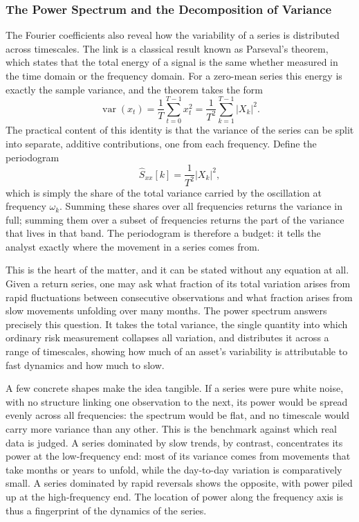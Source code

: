 \documentclass[12pt,a4paper]{article}
\begin{document}
\subsubsection{The Power Spectrum and the Decomposition of Variance}
\label{sec:power_spectrum}

The Fourier coefficients also reveal how the variability of a series is
distributed across timescales. The link is a classical result known as
Parseval's theorem, which states that the total energy of a signal is the
same whether measured in the time domain or the frequency domain. For a
zero-mean series this energy is exactly the sample variance, and the
theorem takes the form
\begin{equation}
    \operatorname{var}(x_t) = \frac{1}{T} \sum_{t=0}^{T-1} x_t^2
    = \frac{1}{T^2} \sum_{k=1}^{T-1} |X_k|^2.
\end{equation}
The practical content of this identity is that the variance of the series
can be split into separate, additive contributions, one from each
frequency. Define the periodogram
\begin{equation}
    \hat{S}_{xx}[k] = \frac{1}{T^2} |X_k|^2,
\end{equation}
which is simply the share of the total variance carried by the
oscillation at frequency $\omega_k$. Summing these shares over all
frequencies returns the variance in full; summing them over a subset of
frequencies returns the part of the variance that lives in that band. The
periodogram is therefore a budget: it tells the analyst exactly where the
movement in a series comes from.

This is the heart of the matter, and it can be stated without any
equation at all. Given a return series, one may ask what fraction of its
total variation arises from rapid fluctuations between consecutive
observations and what fraction arises from slow movements unfolding over
many months. The power spectrum answers precisely this question. It takes
the total variance, the single quantity into which ordinary risk
measurement collapses all variation, and distributes it across a range of
timescales, showing how much of an asset's variability is attributable to
fast dynamics and how much to slow.

A few concrete shapes make the idea tangible. If a series were pure white
noise, with no structure linking one observation to the next, its power
would be spread evenly across all frequencies: the spectrum would be
flat, and no timescale would carry more variance than any other. This is
the benchmark against which real data is judged. A series dominated by
slow trends, by contrast, concentrates its power at the low-frequency
end: most of its variance comes from movements that take months or years
to unfold, while the day-to-day variation is comparatively small. A
series dominated by rapid reversals shows the opposite, with power piled
up at the high-frequency end. The location of power along the frequency
axis is thus a fingerprint of the dynamics of the series.
\end{document}
